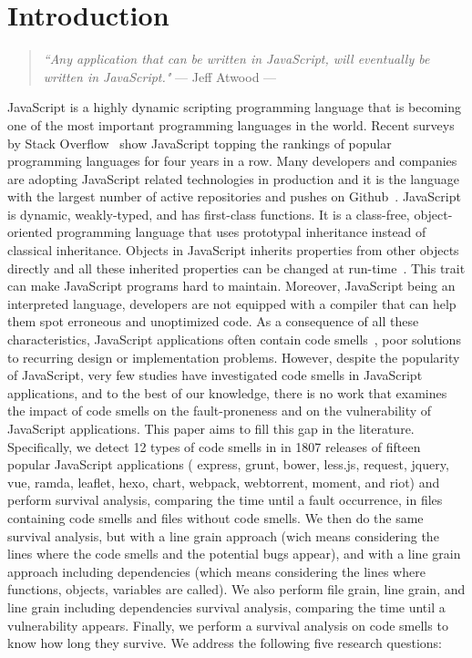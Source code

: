 \section{Introduction}
\begin{quote}
\emph{``Any application that can be written in JavaScript, will eventually be written in JavaScript."} \newline --- Jeff Atwood ---
\end{quote}

JavaScript is a highly dynamic scripting programming language that is becoming one of the most important programming languages in the world. Recent surveys by Stack Overflow~\cite{so:survay2016} show JavaScript topping the rankings of popular programming languages for four years in a row. Many developers and companies are adopting JavaScript related technologies in production and it is the language with the largest number of active repositories and pushes on Github~\cite{githut}. JavaScript is dynamic, weakly-typed, and has first-class functions. It is a class-free, object-oriented programming language that uses prototypal inheritance instead of classical inheritance. Objects in JavaScript inherits properties from other objects directly and all these inherited properties can be changed at run-time~\cite{fard2013jsnose}. This trait can make JavaScript programs hard to maintain. Moreover, JavaScript being an interpreted language, developers are not equipped with a compiler that can help them spot erroneous and unoptimized code. As a consequence of all these characteristics, JavaScript applications often contain code smells~\cite{fowler1997refactoring}, \ie{} poor solutions to recurring design or implementation problems. However, despite the popularity of JavaScript, very few studies have investigated code smells in JavaScript applications, and to the best of our knowledge, there is no work that examines the impact of code smells on the fault-proneness {\color{blue}and on the vulnerability} of JavaScript applications. This paper aims to fill this gap in the literature. Specifically, we detect 12 types of code smells in in {\color{blue}1807} releases of {\color{blue}fifteen} popular JavaScript applications (\ie{} express, grunt, bower, less.js, request, {\color{blue}jquery, vue, ramda, leaflet, hexo, chart, webpack, webtorrent, moment, and riot}) and perform survival analysis, comparing the time until a fault occurrence, in files containing code smells and files without code smells. {\color{blue}We then do the same survival analysis, but with a line grain approach (wich means considering the lines where the code smells and the potential bugs appear), and with a line grain approach including dependencies (which means considering the lines where functions, objects, variables are called). We also perform file grain, line grain, and line grain including dependencies survival analysis, comparing the time until a vulnerability appears. Finally, we perform a survival analysis on code smells to know how long they survive.} We address the following {\color{blue}five} research questions:

